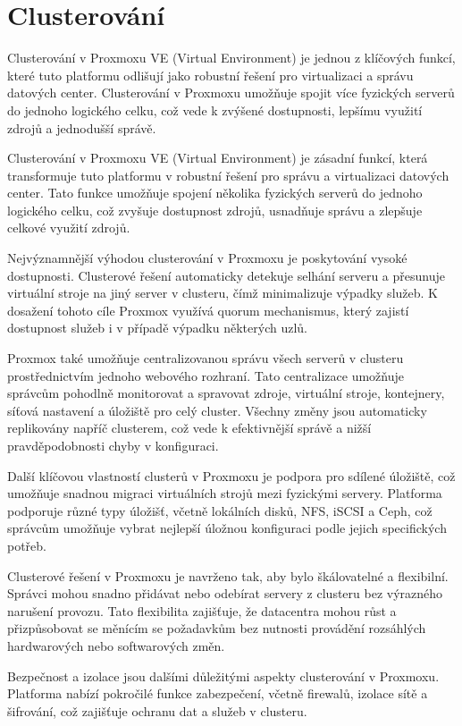 \chapter{Clusterování}
Clusterování v Proxmoxu VE (Virtual Environment) je jednou z klíčových funkcí, které tuto platformu odlišují jako robustní řešení pro virtualizaci a správu datových center. Clusterování v Proxmoxu umožňuje spojit více fyzických serverů do jednoho logického celku, což vede k zvýšené dostupnosti, lepšímu využití zdrojů a jednodušší správě.

Clusterování v Proxmoxu VE (Virtual Environment) je zásadní funkcí, která transformuje tuto platformu v robustní řešení pro správu a virtualizaci datových center. Tato funkce umožňuje spojení několika fyzických serverů do jednoho logického celku, což zvyšuje dostupnost zdrojů, usnadňuje správu a zlepšuje celkové využití zdrojů.

Nejvýznamnější výhodou clusterování v Proxmoxu je poskytování vysoké dostupnosti. Clusterové řešení automaticky detekuje selhání serveru a přesunuje virtuální stroje na jiný server v clusteru, čímž minimalizuje výpadky služeb. K dosažení tohoto cíle Proxmox využívá quorum mechanismus, který zajistí dostupnost služeb i v případě výpadku některých uzlů.

Proxmox také umožňuje centralizovanou správu všech serverů v clusteru prostřednictvím jednoho webového rozhraní. Tato centralizace umožňuje správcům pohodlně monitorovat a spravovat zdroje, virtuální stroje, kontejnery, síťová nastavení a úložiště pro celý cluster. Všechny změny jsou automaticky replikovány napříč clusterem, což vede k efektivnější správě a nižší pravděpodobnosti chyby v konfiguraci.

Další klíčovou vlastností clusterů v Proxmoxu je podpora pro sdílené úložiště, což umožňuje snadnou migraci virtuálních strojů mezi fyzickými servery. Platforma podporuje různé typy úložišť, včetně lokálních disků, NFS, iSCSI a Ceph, což správcům umožňuje vybrat nejlepší úložnou konfiguraci podle jejich specifických potřeb.

Clusterové řešení v Proxmoxu je navrženo tak, aby bylo škálovatelné a flexibilní. Správci mohou snadno přidávat nebo odebírat servery z clusteru bez výrazného narušení provozu. Tato flexibilita zajišťuje, že datacentra mohou růst a přizpůsobovat se měnícím se požadavkům bez nutnosti provádění rozsáhlých hardwarových nebo softwarových změn.

\pagebreak

Bezpečnost a izolace jsou dalšími důležitými aspekty clusterování v Proxmoxu. Platforma nabízí pokročilé funkce zabezpečení, včetně firewalů, izolace sítě a šifrování, což zajišťuje ochranu dat a služeb v clusteru.

